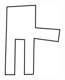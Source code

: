 \begin{figure}
\includegraphics[width=\linewidth]{output/1.models/hand_built/hand_curve.png}

\end{figure}
